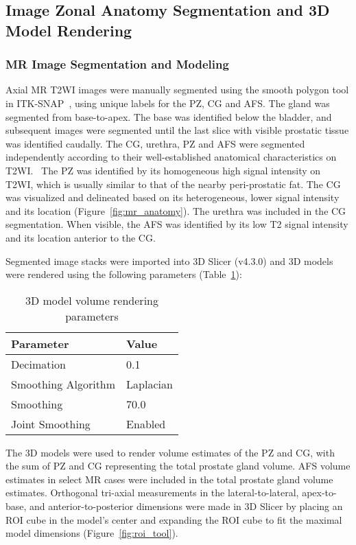 \subsection{Image Zonal Anatomy Segmentation and 3D Model Rendering}
\subsubsection{MR Image Segmentation and Modeling}
Axial MR T2WI images were manually segmented using the smooth polygon tool in
ITK-SNAP~\cite{Yushkevich2006}, using unique labels for the PZ, CG and AFS. The
gland was segmented from base-to-apex.  The base was identified below the
bladder, and subsequent images were segmented until the last slice with visible
prostatic tissue was identified caudally. The CG, urethra, PZ and AFS were
segmented independently according to their well-established anatomical
characteristics on
T2WI.~\cite{Barentsz2012,Jung2012,Poon1985,Hricak2007,Bonekamp2011} The PZ was
identified by its homogeneous high signal intensity on T2WI, which is usually
similar to that of the nearby peri-prostatic fat. The CG was visualized and
delineated based on its heterogeneous, lower signal intensity and its location
(Figure~\ref{fig:mr_anatomy}). The urethra was included in the CG segmentation.
When visible, the AFS was identified by its low T2 signal intensity and its
location anterior to the CG. 



Segmented image stacks were imported into 3D Slicer (v4.3.0) and 3D
models were rendered using the following parameters (Table~\ref{tab:3dslicer}):

\begin{table}[h!]
\centering
\caption{3D model volume rendering parameters}
\begin{tabular}{ll}
{\bf Parameter} & {\bf Value} \\ \hline
Decimation & 0.1 \\
Smoothing Algorithm & Laplacian \\
Smoothing  & 70.0 \\
Joint Smoothing & Enabled \\
\end{tabular}
\label{tab:3dslicer}
\end{table}

The 3D models were used to render volume estimates of the PZ and CG, with the
sum of PZ and CG representing the total prostate gland volume. AFS volume
estimates in select MR cases were included in the total prostate gland volume
estimates. Orthogonal tri-axial measurements in the lateral-to-lateral,
apex-to-base, and anterior-to-posterior dimensions were made in 3D Slicer by
placing an ROI cube in the model's center and expanding the ROI cube to fit the
maximal model dimensions (Figure~\ref{fig:roi_tool}). 

